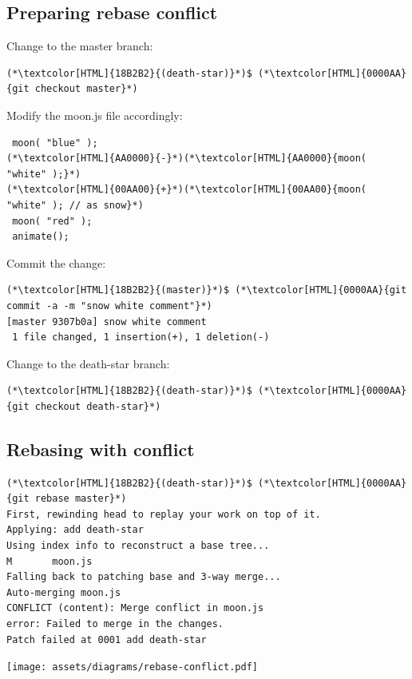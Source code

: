 \subsection{Preparing rebase conflict}
\begin{frame}[fragile]
  \subslidetitle
  Change to the master branch:
   \begin{lstlisting}
(*\textcolor[HTML]{18B2B2}{(death-star)}*)$ (*\textcolor[HTML]{0000AA}{git checkout master}*)
\end{lstlisting}

  Modify the moon.js file accordingly:
  \begin{lstlisting}
 moon( "blue" );
(*\textcolor[HTML]{AA0000}{-}*)(*\textcolor[HTML]{AA0000}{moon( "white" );}*)
(*\textcolor[HTML]{00AA00}{+}*)(*\textcolor[HTML]{00AA00}{moon( "white" ); // as snow}*)
 moon( "red" );
 animate();
\end{lstlisting}

  Commit the change:
  \begin{lstlisting}
(*\textcolor[HTML]{18B2B2}{(master)}*)$ (*\textcolor[HTML]{0000AA}{git commit -a -m "snow white comment"}*)
[master 9307b0a] snow white comment
 1 file changed, 1 insertion(+), 1 deletion(-)
\end{lstlisting}
  Change to the death-star branch:
   \begin{lstlisting}
(*\textcolor[HTML]{18B2B2}{(death-star)}*)$ (*\textcolor[HTML]{0000AA}{git checkout death-star}*)
\end{lstlisting}
\end{frame}

\subsection{Rebasing with conflict}
\begin{frame}[fragile]
  \subslidetitle
  \begin{lstlisting}
(*\textcolor[HTML]{18B2B2}{(death-star)}*)$ (*\textcolor[HTML]{0000AA}{git rebase master}*)
First, rewinding head to replay your work on top of it.
Applying: add death-star
Using index info to reconstruct a base tree...
M       moon.js
Falling back to patching base and 3-way merge...
Auto-merging moon.js
CONFLICT (content): Merge conflict in moon.js
error: Failed to merge in the changes.
Patch failed at 0001 add death-star
\end{lstlisting}

  \vspace{1em}
  \centerline{\texttt{[image: assets/diagrams/rebase-conflict.pdf]}}
\end{frame}

